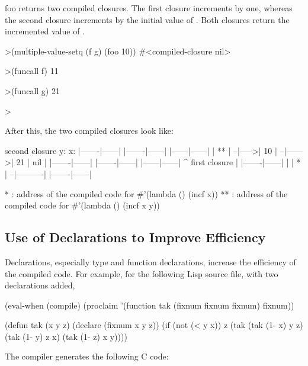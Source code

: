{\code foo} returns two compiled closures.  The first closure
increments  by one, whereas the second closure increments
 by the initial value of .  Both closures return the
incremented value of .

\begin{example} 
        >(multiple-value-setq (f g) (foo 10))
        #<compiled-closure nil>

        >(funcall f)
        11

        >(funcall g)
        21

        >
\end{example}

After this, the two compiled closures look like:

\begin{example}
second closure       y:                     x:
|-------|------|      |-------|------|       |------|------| 
|  **   |    --|----->|  10   |    --|------>|  21  | nil  |
|-------|------|      |-------|------|       |------|------| 
                                                ^
                      first closure             |
                      |-------|------|          |
                      |   *   |    --|----------| 
                      |-------|------| 

 * : address of the compiled code for #'(lambda () (incf x))
** : address of the compiled code for #'(lambda () (incf x y))
\end{example}

\subsection{Use of Declarations to Improve Efficiency}

Declarations, especially  type  and  function  declarations,
increase the efficiency of the compiled code.  For example, for the
following Lisp source file, with two \clisp{} declarations added,

\begin{example}
   (eval-when (compile)
     (proclaim '(function tak (fixnum fixnum fixnum) fixnum))

   (defun tak (x y z)
     (declare (fixnum x y z))
     (if (not (< y x))
         z
         (tak (tak (1- x) y z)
              (tak (1- y) z x)
              (tak (1- z) x y))))
\end{example}

The compiler generates the following C code:

